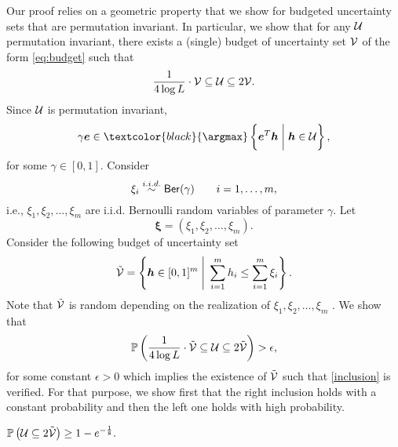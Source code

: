 \documentclass[moor]{informs1}              %
\newcommand{\mb}[1]{\ensuremath{\boldsymbol{#1}}}
\newcommand*{\red}{\textcolor{black}}
\begin{document}
Our proof relies on a geometric property that we show for budgeted uncertainty sets that are permutation invariant. In particular, we show that  for any $\cal U$ permutation invariant, there exists a (single) budget of uncertainty set $\cal V$ of the form \eqref{eq:budget} such that
\begin{equation}\label{inclusion}
 \frac{1}{4 \log L} \cdot {\cal V} \subseteq {\cal U}  \subseteq  2  {\cal V}.
\end{equation}
Since ${\cal U}$ is permutation invariant, 
$$ \gamma  \mb e \in \red{{\argmax}} \left\{ \mb e^T \mb h \; \bigg\vert \; \mb h \in {\cal U} \right\},$$
for some $ \gamma \in [0,1]$. Consider
$$  {\xi}_i \overset{i.i.d.}{\sim} {\sf Ber} ( \gamma) \qquad  i=1,\ldots,m,$$
i.e., ${\xi}_1, {\xi}_2, \ldots, {\xi}_m$ are i.i.d. Bernoulli random variables of parameter $ \gamma$. Let $$\mb {\xi} = ({\xi}_1, {\xi}_2, \ldots, {\xi}_m).$$ 
Consider the following  budget of uncertainty set 
$$ \tilde{\cal V} = \left\{ \mb h \in [0,1]^m  \; \Bigg\vert \;   \sum_{i=1}^m h_i \leq  \sum_{i=1}^m {\xi}_i  \right\}.$$
Note that  $\tilde{\cal V}$ is random depending on the realization of ${\xi}_1, {\xi}_2, \ldots, {\xi}_m$ . We show that 
$$\mathbb{P} \left( \frac{1}{4 \log L} \cdot \tilde{\cal V} \subseteq {\cal U}  \subseteq  2  \tilde{\cal V} \right) > \epsilon ,$$ for some constant $\epsilon >0$ which implies the existence of $\tilde{\cal V}$  such that \eqref{inclusion} is verified. For that purpose, we show first that the right inclusion holds with a constant probability and then the left one holds with high probability.


\begin{claim}\label{claim:5.1} 
$\mathbb{P} \left( {\cal U} \subseteq 2  \tilde{\cal V} \right) \geq  1-  e^{-\frac{1}{8}}.$
\end{claim}
\end{document}
